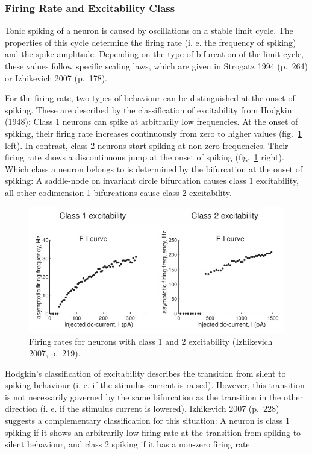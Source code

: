 \documentclass[12pt,a4paper,]{report}
\begin{document}
\subsubsection{Firing Rate and Excitability Class}\label{excitability}

Tonic spiking of a neuron is caused by oscillations on a stable limit
cycle. The properties of this cycle determine the firing rate (i. e. the
frequency of spiking) and the spike amplitude. Depending on the type of
bifurcation of the limit cycle, these values follow specific scaling
laws, which are given in Strogatz 1994 (p.~264) or Izhikevich 2007
(p.~178).

For the firing rate, two types of behaviour can be distinguished at the
onset of spiking. These are described by the classification of
excitability from Hodgkin (1948): Class 1 neurons can spike at
arbitrarily low frequencies. At the onset of spiking, their firing rate
increases continuously from zero to higher values
(fig.~\ref{hodgkin-classification} left). In contrast, class 2 neurons
start spiking at non-zero frequencies. Their firing rate shows a
discontinuous jump at the onset of spiking
(fig.~\ref{hodgkin-classification} right). Which class a neuron belongs
to is determined by the bifurcation at the onset of spiking: A
saddle-node on invariant circle bifurcation causes class 1 excitability,
all other codimension-1 bifurcations cause class 2 excitability.

\begin{figure}
\centering
\includegraphics[width=0.800\hsize]{images/Izhikevich_2007_p_219.jpg}
\caption[Firing rates for neurons with class 1 and 2 excitability]{Firing rates for neurons with class 1 and 2 excitability
(Izhikevich 2007, p.~219).}\label{hodgkin-classification}
\end{figure}

Hodgkin's classification of excitability describes the transition from
silent to spiking behaviour (i. e. if the stimulus current is raised).
However, this transition is not necessarily governed by the same
bifurcation as the transition in the other direction (i. e. if the
stimulus current is lowered). Izhikevich 2007 (p.~228) suggests a
complementary classification for this situation: A neuron is class 1
spiking if it shows an arbitrarily low firing rate at the transition
from spiking to silent behaviour, and class 2 spiking if it has a
non-zero firing rate.
\end{document}
